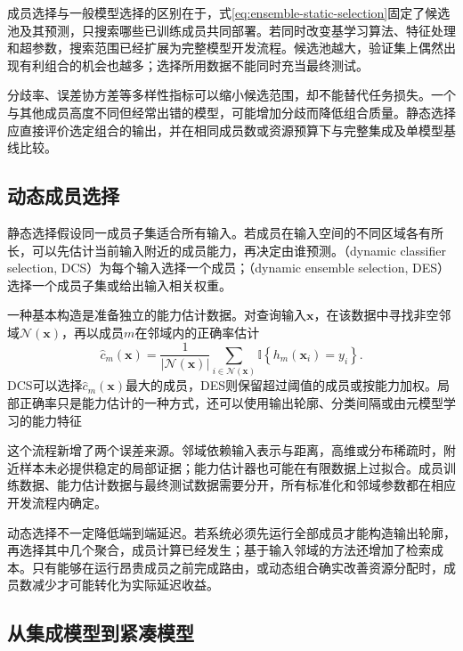 成员选择与一般模型选择的区别在于，式\eqref{eq:ensemble-static-selection}固定了候选池及其预测，只搜索哪些已训练成员共同部署。若同时改变基学习算法、特征处理和超参数，搜索范围已经扩展为完整模型开发流程。候选池越大，验证集上偶然出现有利组合的机会也越多；选择所用数据不能同时充当最终测试。

分歧率、误差协方差等多样性指标可以缩小候选范围，却不能替代任务损失。一个与其他成员高度不同但经常出错的模型，可能增加分歧而降低组合质量。静态选择应直接评价选定组合的输出，并在相同成员数或资源预算下与完整集成及单模型基线比较。

\subsection{动态成员选择}
\label{sec:ensemble-dynamic-selection}

静态选择假设同一成员子集适合所有输入。若成员在输入空间的不同区域各有所长，可以先估计当前输入附近的成员能力，再决定由谁预测。（dynamic classifier selection, DCS）为每个输入选择一个成员；（dynamic ensemble selection, DES）选择一个成员子集或给出输入相关权重。

一种基本构造是准备独立的能力估计数据。对查询输入$\bm{x}$，在该数据中寻找非空邻域$\mathcal{N}(\bm{x})$，再以成员$m$在邻域内的正确率估计
\begin{equation}
  \widehat{c}_m(\bm{x})
  =
  \frac{1}{|\mathcal{N}(\bm{x})|}
  \sum_{i\in\mathcal{N}(\bm{x})}
  \mathbb{I}\!\left\{h_m(\bm{x}_i)=y_i\right\}.
  \label{eq:ensemble-local-competence}
\end{equation}
DCS可以选择$\widehat{c}_m(\bm{x})$最大的成员，DES则保留超过阈值的成员或按能力加权。局部正确率只是能力估计的一种方式，还可以使用输出轮廓、分类间隔或由元模型学习的能力特征

这个流程新增了两个误差来源。邻域依赖输入表示与距离，高维或分布稀疏时，附近样本未必提供稳定的局部证据；能力估计器也可能在有限数据上过拟合。成员训练数据、能力估计数据与最终测试数据需要分开，所有标准化和邻域参数都在相应开发流程内确定。

动态选择不一定降低端到端延迟。若系统必须先运行全部成员才能构造输出轮廓，再选择其中几个聚合，成员计算已经发生；基于输入邻域的方法还增加了检索成本。只有能够在运行昂贵成员之前完成路由，或动态组合确实改善资源分配时，成员数减少才可能转化为实际延迟收益。

\subsection{从集成模型到紧凑模型}
\label{sec:ensemble-compression}

